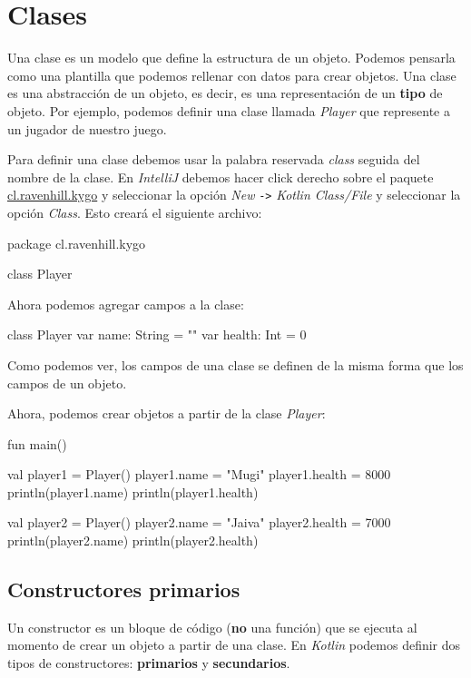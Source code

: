 \section{Clases}
  Una clase es un modelo que define la estructura de un objeto.
  Podemos pensarla como una plantilla que podemos rellenar con datos para crear objetos.
  Una clase es una abstracción de un objeto, es decir, es una representación de un \textbf{tipo} de
  objeto.
  Por ejemplo, podemos definir una clase llamada \textit{Player} que represente a un jugador de 
  nuestro juego.

  Para definir una clase debemos usar la palabra reservada \textit{class} seguida del nombre de la
  clase.
  En \textit{IntelliJ} debemos hacer click derecho sobre el paquete \url{cl.ravenhill.kygo}
  y seleccionar la opción \textit{New} \texttt{->} \textit{Kotlin Class/File} y seleccionar la 
  opción \textit{Class}.
  Esto creará el siguiente archivo:

  \begin{kotlin}
    package cl.ravenhill.kygo

    class Player {
    }
  \end{kotlin}

  Ahora podemos agregar campos a la clase:

  \begin{kotlin}
    class Player {
      var name: String = ""
      var health: Int = 0
    }
  \end{kotlin}

  Como podemos ver, los campos de una clase se definen de la misma forma que los campos de un 
  objeto.

  Ahora, podemos crear objetos a partir de la clase \textit{Player}:

  \begin{kotlin}
    fun main() {
      val player1 = Player()
      player1.name = "Mugi"
      player1.health = 8000
      println(player1.name)
      println(player1.health)
      
      val player2 = Player()
      player2.name = "Jaiva"
      player2.health = 7000
      println(player2.name)
      println(player2.health)
    }
  \end{kotlin}

  \subsection{Constructores primarios}
    Un constructor es un bloque de código (\textbf{no} una función) que se ejecuta al momento de 
    crear un objeto a partir de una clase.
    En \textit{Kotlin} podemos definir dos tipos de constructores: \textbf{primarios} y
    \textbf{secundarios}.

